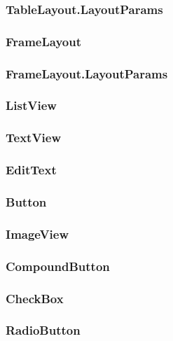 \documentclass{report}
\begin{document}
\begin{itemize}
    \pagebreak 
    \subsubsection{TableLayout.LayoutParams}

    \pagebreak 
    \subsubsection{FrameLayout}

    \pagebreak 
    \subsubsection{FrameLayout.LayoutParams}

    \pagebreak 
    \subsubsection{ListView}

    \pagebreak 
    \subsubsection{TextView}

    \pagebreak 
    \subsubsection{EditText}

    \pagebreak 
    \subsubsection{Button}

    \pagebreak 
    \subsubsection{ImageView}

    \pagebreak 
    \subsubsection{CompoundButton}

    \pagebreak 
    \subsubsection{CheckBox}

    \pagebreak 
    \subsubsection{RadioButton}


\end{itemize}
\end{document}
